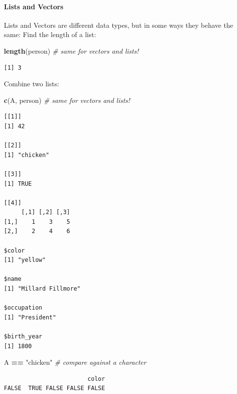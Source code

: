 \documentclass[
]{article}
\newenvironment{Shaded}{\begin{snugshade}}{\end{snugshade}}
\newcommand{\CommentTok}[1]{\textcolor[rgb]{0.56,0.35,0.01}{\textit{#1}}}
\newcommand{\KeywordTok}[1]{\textcolor[rgb]{0.13,0.29,0.53}{\textbf{#1}}}
\newcommand{\NormalTok}[1]{#1}
\newcommand{\OperatorTok}[1]{\textcolor[rgb]{0.81,0.36,0.00}{\textbf{#1}}}
\newcommand{\StringTok}[1]{\textcolor[rgb]{0.31,0.60,0.02}{#1}}
\begin{document}
\hypertarget{lists-and-vectors}{%
\paragraph{Lists and Vectors}\label{lists-and-vectors}}

Lists and Vectors are different data types, but in some ways they behave the same:
Find the length of a list:

\begin{Shaded}
\begin{Highlighting}[]
\KeywordTok{length}\NormalTok{(person)  }\CommentTok{# same for vectors and lists!}
\end{Highlighting}
\end{Shaded}

\begin{verbatim}
[1] 3
\end{verbatim}

Combine two lists:

\begin{Shaded}
\begin{Highlighting}[]
\KeywordTok{c}\NormalTok{(A, person)  }\CommentTok{# same for vectors and lists!}
\end{Highlighting}
\end{Shaded}

\begin{verbatim}
[[1]]
[1] 42

[[2]]
[1] "chicken"

[[3]]
[1] TRUE

[[4]]
     [,1] [,2] [,3]
[1,]    1    3    5
[2,]    2    4    6

$color
[1] "yellow"

$name
[1] "Millard Fillmore"

$occupation
[1] "President"

$birth_year
[1] 1800
\end{verbatim}

\begin{Shaded}
\begin{Highlighting}[]
\NormalTok{A }\OperatorTok{==}\StringTok{ "chicken"}   \CommentTok{# compare against a character}
\end{Highlighting}
\end{Shaded}

\begin{verbatim}
                        color 
FALSE  TRUE FALSE FALSE FALSE 
\end{verbatim}
\end{document}
